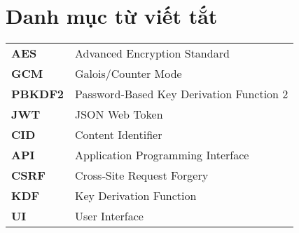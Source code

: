 \chapter*{Danh mục từ viết tắt}
\begin{tabular}{@{}ll}
\textbf{AES} & Advanced Encryption Standard \\
\textbf{GCM} & Galois/Counter Mode \\
\textbf{PBKDF2} & Password‑Based Key Derivation Function 2 \\
\textbf{JWT} & JSON Web Token \\
\textbf{CID} & Content Identifier \\
\textbf{API} & Application Programming Interface \\
\textbf{CSRF} & Cross‑Site Request Forgery \\
\textbf{KDF} & Key Derivation Function \\
\textbf{UI} & User Interface \\
\end{tabular}

